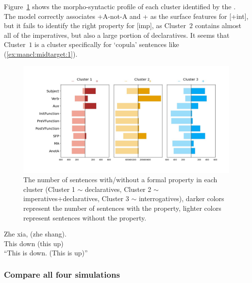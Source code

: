 Figure~\ref{fig:man-target-mid-syncluster} shows the morpho-syntactic profile of each cluster identified by the \plearnerabbr{}. The model correctly associates +A-not-A and + as the surface features for [+int], but it fails to identify the right property for [imp], as Cluster~$2$ contains almost all of the imperatives, but also a large portion of declaratives. It seems that Cluster~$1$ is a cluster specifically for `copula' sentences like (\ref{ex:mancl:midtarget:1}). 

\begin{figure}[H]
    \centering
    \includegraphics[width=1\textwidth]{figures/man-target-mid-syncluster.jpg}
    \caption{The number of sentences with/without a formal property in each cluster (Cluster 1 $\sim$ declaratives, Cluster 2 $\sim$ imperatives+declaratives, Cluster 3 $\sim$ interrogatives), darker colors represent the number of sentences with the property, lighter colors represent sentences without the property.}
    \label{fig:man-target-mid-syncluster}
\end{figure}

\gll Zhe xia, (zhe shang).\\
This down (this up)\\
``This is down. (This is up)''
\eex

\subsubsection{Compare all four simulations}

